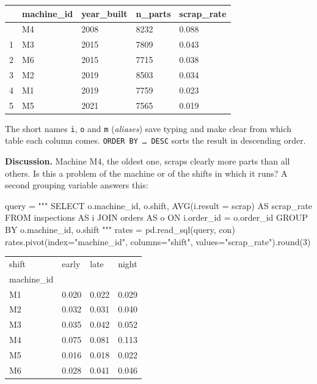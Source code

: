 \documentclass[
  letterpaper,
  DIV=11,
  numbers=noendperiod]{scrreprt}
\newenvironment{Shaded}{\begin{snugshade}}{\end{snugshade}}
\newcommand{\BuiltInTok}[1]{\textcolor[rgb]{0.00,0.23,0.31}{#1}}
\newcommand{\DecValTok}[1]{\textcolor[rgb]{0.68,0.00,0.00}{#1}}
\newcommand{\NormalTok}[1]{\textcolor[rgb]{0.00,0.23,0.31}{#1}}
\newcommand{\OperatorTok}[1]{\textcolor[rgb]{0.37,0.37,0.37}{#1}}
\newcommand{\StringTok}[1]{\textcolor[rgb]{0.13,0.47,0.30}{#1}}
\begin{document}
\begin{longtable}[]{@{}lllll@{}}
\toprule\noalign{}
& machine\_id & year\_built & n\_parts & scrap\_rate \\
\midrule\noalign{}
\endhead
\bottomrule\noalign{}
\endlastfoot
0 & M4 & 2008 & 8232 & 0.088 \\
1 & M3 & 2015 & 7809 & 0.043 \\
2 & M6 & 2015 & 7715 & 0.038 \\
3 & M2 & 2019 & 8503 & 0.034 \\
4 & M1 & 2019 & 7759 & 0.023 \\
5 & M5 & 2021 & 7565 & 0.019 \\
\end{longtable}

The short names \texttt{i}, \texttt{o} and \texttt{m} (\emph{aliases})
save typing and make clear from which table each column comes.
\texttt{ORDER\ BY\ …\ DESC} sorts the result in descending order.

\textbf{Discussion.} Machine M4, the oldest one, scraps clearly more
parts than all others. Is this a problem of the machine or of the shifts
in which it runs? A second grouping variable answers this:

\begin{Shaded}
\begin{Highlighting}[]
\NormalTok{query }\OperatorTok{=} \StringTok{"""}
\StringTok{SELECT o.machine\_id, o.shift, AVG(i.result = \textquotesingle{}scrap\textquotesingle{}) AS scrap\_rate}
\StringTok{FROM inspections AS i}
\StringTok{JOIN orders AS o ON i.order\_id = o.order\_id}
\StringTok{GROUP BY o.machine\_id, o.shift}
\StringTok{"""}
\NormalTok{rates }\OperatorTok{=}\NormalTok{ pd.read\_sql(query, con)}
\NormalTok{rates.pivot(index}\OperatorTok{=}\StringTok{"machine\_id"}\NormalTok{, columns}\OperatorTok{=}\StringTok{"shift"}\NormalTok{, values}\OperatorTok{=}\StringTok{"scrap\_rate"}\NormalTok{).}\BuiltInTok{round}\NormalTok{(}\DecValTok{3}\NormalTok{)}
\end{Highlighting}
\end{Shaded}

\begin{longtable}[]{@{}llll@{}}
\toprule\noalign{}
shift & early & late & night \\
machine\_id & & & \\
\midrule\noalign{}
\endhead
\bottomrule\noalign{}
\endlastfoot
M1 & 0.020 & 0.022 & 0.029 \\
M2 & 0.032 & 0.031 & 0.040 \\
M3 & 0.035 & 0.042 & 0.052 \\
M4 & 0.075 & 0.081 & 0.113 \\
M5 & 0.016 & 0.018 & 0.022 \\
M6 & 0.028 & 0.041 & 0.046 \\
\end{longtable}
\end{document}
